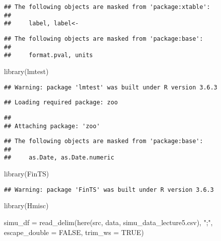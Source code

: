 \documentclass[]{article}
\newenvironment{Shaded}{\begin{snugshade}}{\end{snugshade}}
\newcommand{\AttributeTok}[1]{\textcolor[rgb]{0.77,0.63,0.00}{#1}}
\newcommand{\ConstantTok}[1]{\textcolor[rgb]{0.00,0.00,0.00}{#1}}
\newcommand{\FunctionTok}[1]{\textcolor[rgb]{0.00,0.00,0.00}{#1}}
\newcommand{\NormalTok}[1]{#1}
\newcommand{\OtherTok}[1]{\textcolor[rgb]{0.56,0.35,0.01}{#1}}
\newcommand{\StringTok}[1]{\textcolor[rgb]{0.31,0.60,0.02}{#1}}
\begin{document}
\begin{verbatim}
## The following objects are masked from 'package:xtable':
## 
##     label, label<-
\end{verbatim}

\begin{verbatim}
## The following objects are masked from 'package:base':
## 
##     format.pval, units
\end{verbatim}

\begin{Shaded}
\begin{Highlighting}[]
\FunctionTok{library}\NormalTok{(lmtest)}
\end{Highlighting}
\end{Shaded}

\begin{verbatim}
## Warning: package 'lmtest' was built under R version 3.6.3
\end{verbatim}

\begin{verbatim}
## Loading required package: zoo
\end{verbatim}

\begin{verbatim}
## 
## Attaching package: 'zoo'
\end{verbatim}

\begin{verbatim}
## The following objects are masked from 'package:base':
## 
##     as.Date, as.Date.numeric
\end{verbatim}

\begin{Shaded}
\begin{Highlighting}[]
\FunctionTok{library}\NormalTok{(FinTS)}
\end{Highlighting}
\end{Shaded}

\begin{verbatim}
## Warning: package 'FinTS' was built under R version 3.6.3
\end{verbatim}

\begin{Shaded}
\begin{Highlighting}[]
\FunctionTok{library}\NormalTok{(Hmisc)}

\NormalTok{simu\_df }\OtherTok{=} \FunctionTok{read\_delim}\NormalTok{(}\FunctionTok{here}\NormalTok{(}\StringTok{\textquotesingle{}src\textquotesingle{}}\NormalTok{, }\StringTok{\textquotesingle{}data\textquotesingle{}}\NormalTok{, }\StringTok{\textquotesingle{}simu\_data\_lecture5.csv\textquotesingle{}}\NormalTok{), }\StringTok{";"}\NormalTok{, }\AttributeTok{escape\_double =} \ConstantTok{FALSE}\NormalTok{, }\AttributeTok{trim\_ws =} \ConstantTok{TRUE}\NormalTok{)}
\end{Highlighting}
\end{Shaded}
\end{document}
